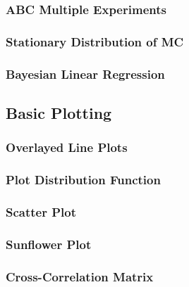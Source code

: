 \subsubsection{ABC Multiple Experiments}


\clearpage

\subsubsection{Stationary Distribution of MC}


\subsubsection{Bayesian Linear Regression}


\subsection{Basic Plotting}

\subsubsection{Overlayed Line Plots}


\subsubsection{Plot Distribution Function}


\subsubsection{Scatter Plot}


\clearpage

\subsubsection{Sunflower Plot}


\subsubsection{Cross-Correlation Matrix}

